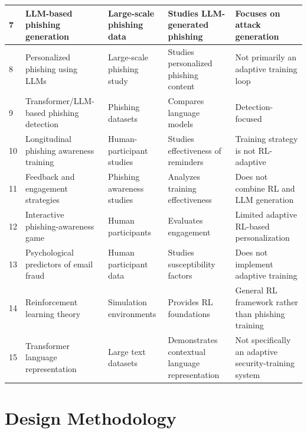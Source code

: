 \documentclass[12pt,a4paper]{article}
\begin{document}
\begin{landscape}
\begin{longtable}{|
P{0.8cm}|
P{5.0cm}|
P{4.2cm}|
P{5.2cm}|
P{7.4cm}|
}
7 &
LLM-based phishing generation &
Large-scale phishing data &
Studies LLM-generated phishing &
Focuses on attack generation
\\
\hline

8 &
Personalized phishing using LLMs &
Large-scale phishing study &
Studies personalized phishing content &
Not primarily an adaptive training loop
\\
\hline

9 &
Transformer/LLM-based phishing detection &
Phishing datasets &
Compares language models &
Detection-focused
\\
\hline

10 &
Longitudinal phishing awareness training &
Human-participant studies &
Studies effectiveness of reminders &
Training strategy is not RL-adaptive
\\
\hline

11 &
Feedback and engagement strategies &
Phishing awareness studies &
Analyzes training effectiveness &
Does not combine RL and LLM generation
\\
\hline

12 &
Interactive phishing-awareness game &
Human participants &
Evaluates engagement &
Limited adaptive RL-based personalization
\\
\hline

13 &
Psychological predictors of email fraud &
Human participant data &
Studies susceptibility factors &
Does not implement adaptive training
\\
\hline

14 &
Reinforcement learning theory &
Simulation environments &
Provides RL foundations &
General RL framework rather than phishing training
\\
\hline

15 &
Transformer language representation &
Large text datasets &
Demonstrates contextual language representation &
Not specifically an adaptive security-training system
\\
\hline

\end{longtable}
\normalsize
\end{landscape}



\section{Design Methodology}
\end{document}
